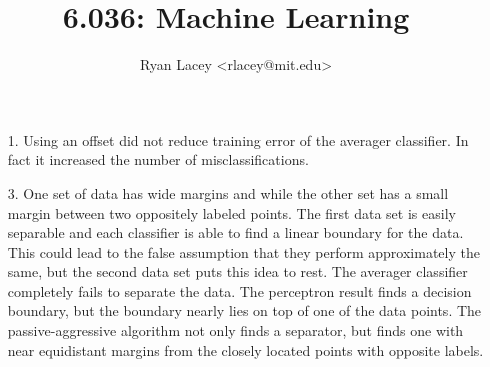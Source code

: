 \documentclass{article}
\begin{document}

\title{6.036: Machine Learning}
\author{
  Ryan Lacey <rlacey@mit.edu>\\
}
        
\maketitle
        

\begin{enumerate}
\item[1.] Using an offset did not reduce training error of the averager classifier. In fact it increased the number of misclassifications.

\bigskip

\item[3.] One set of data has wide margins and while the other set has a small margin between two oppositely labeled points. The first data set is easily separable and each classifier is able to find a linear boundary for the data. This could lead to the false assumption that they perform approximately the same, but the second data set puts this idea to rest. The averager classifier completely fails to separate the data. The perceptron result finds a decision boundary, but the boundary nearly lies on top of one of the data points. The passive-aggressive algorithm not only finds a separator, but finds one with near equidistant margins from the closely located points with opposite labels. \\
\bigskip

\end{enumerate}
\end{document}
